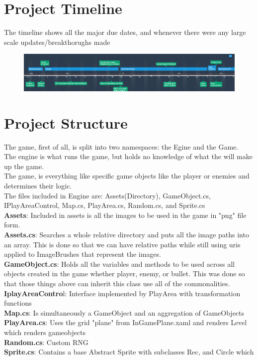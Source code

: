 \documentclass[10pt,conference,onecolumn,compsoc]{IEEEtran}
\begin{document}
\section{Project Timeline} 
The timeline shows all the major due dates, and whenever there were any large scale updates/breakthorughs made
\begin{figure}[ht!]
\includegraphics[scale=.45]{game_timeline.png}
\caption{}
\label{Timeline}
\end{figure}




\section{Project Structure}
The game, first of all, is split into two namespaces: the Egine and the Game. \\
The engine is what runs the game, but holds no knowledge of what the will make up the game.\\
The game, is everything like specific game objects like the player or enemies and determines their logic.\\

The files included in Engine are: Assets(Directory), GameObject.cs, IPlayAreaControl, Map.cs, PlayArea.cs, Random.cs, and Sprite.cs\\

\textbf{Assets}: Included in assets is all the images to be used in the game in "png" file form. \\
\textbf{Assets.cs}: Searches a whole relative directory and puts all the image paths into an array. This is done so that we can have relative
paths while still using uris applied to ImageBrushes that represent the images.\\
\textbf{GameObject.cs}: Holds all the variables and methods to be used across all objects created in the game whether player, enemy, or bullet.
This was done so that those things above can inherit this class use all of the commonalities.\\
\textbf{IplayAreaContro}l: Interface implemented by PlayArea with transformation functions\\
\textbf{Map.cs}: Is simultaneously a GameObject and an aggregation of GameObjects \\
\textbf{PlayArea.cs}: Uses the grid "plane" from InGamePlane.xaml and renders Level which renders gameobjects\\
\textbf{Random.cs}: Custom RNG\\
\textbf{Sprite.cs}: Contains a base Abstract Sprite with subclasses Rec, and Circle which\\
\end{document}
